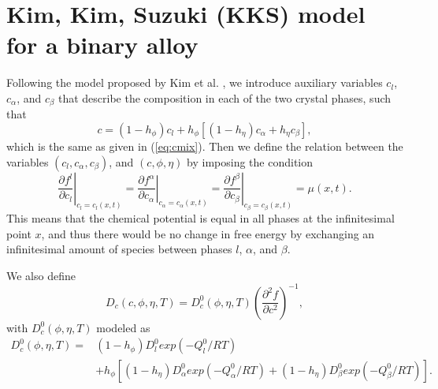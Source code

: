 %
\section{Kim, Kim, Suzuki (KKS) model for a binary alloy}
\label{sec:kks}

Following the model proposed by Kim et al. \cite{PhysRevE.60.7186}, we
introduce auxiliary variables $c_l$, $c_\alpha$, and $c_\beta$ that
describe the composition in each of the two crystal phases, such that
%
\begin{equation}
  c = 
    ( 1 - h_\phi ) c_l +
    h_\phi \left[
    ( 1 - h_\eta ) c_\alpha + h_\eta c_\beta
    \right],
\label{eq:cmixappendix}
\end{equation}
%
which is the same as given in (\ref{eq:cmix}).  Then we define the
relation between the variables $(c_l,c_\alpha,c_\beta)$, and
$(c,\phi,\eta)$ by imposing the condition
%
\begin{equation}
  \left.\frac{\partial f^l}{\partial c_l}
    \right|_{c_l=c_l(x,t)} =
  \left.\frac{\partial f^\alpha}{\partial c_\alpha}
    \right|_{c_\alpha=c_\alpha(x,t)} =
  \left.\frac{\partial f^\beta}{\partial c_\beta}
    \right|_{c_\beta=c_\beta(x,t)} =
  \mu(x,t).
\label{eq:mu}
\end{equation}
%
This means that the chemical potential is equal in all phases at the
infinitesimal point $x$, and thus there would be no change in free
energy by exchanging an infinitesimal amount of species between phases
$l$, $\alpha$, and $\beta$.

We also define
%
\begin{equation}
  D_c(c,\phi,\eta,T) = 
  D_c^0(\phi,\eta,T)
  \left( \frac{\partial^2 f}{\partial c^2} \right)^{-1},
\label{eq:diffcoeff}
\end{equation}
%
with
%
$D_c^0(\phi,\eta,T)$ modeled as
%
\begin{equation}
\begin{split}
  D_c^0(\phi,\eta,T) = {} &
    \left( 1 - h_\phi \right)
    D^0_l exp \left( -Q^0_l / RT \right)
  \\ & +
    h_\phi \left[ \left( 1 - h_\eta \right)
    D^0_\alpha exp \left( -Q^0_\alpha / RT \right) +
    \left( 1 - h_\eta \right)
    D^0_\beta exp \left( -Q^0_\beta / RT \right)
    \right].
\end{split}
\end{equation}

